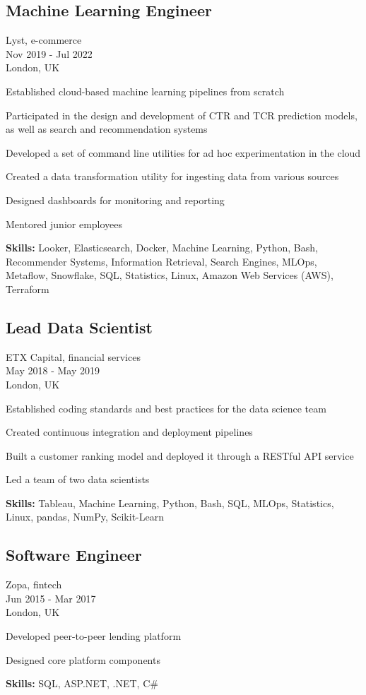 \documentclass[a4paper,10pt]{article}
\begin{document}
\subsection*{Machine Learning Engineer}
Lyst, e-commerce \\
Nov 2019 - Jul 2022 \\
London, UK
\begin{bulletlist}
    \item Established cloud-based machine learning pipelines from scratch
    \item Participated in the design and development of CTR and TCR prediction models, as well as search and recommendation systems
    \item Developed a set of command line utilities for ad hoc experimentation in the cloud
    \item Created a data transformation utility for ingesting data from various sources
    \item Designed dashboards for monitoring and reporting
    \item Mentored junior employees
\end{bulletlist}
\textbf{Skills:} Looker, Elasticsearch, Docker, Machine Learning, Python, Bash, Recommender Systems, Information Retrieval, Search Engines, MLOps, Metaflow, Snowflake, SQL, Statistics, Linux, Amazon Web Services (AWS), Terraform

\subsection*{Lead Data Scientist}
ETX Capital, financial services \\
May 2018 - May 2019 \\
London, UK
\begin{bulletlist}
    \item Established coding standards and best practices for the data science team
    \item Created continuous integration and deployment pipelines
    \item Built a customer ranking model and deployed it through a RESTful API service
    \item Led a team of two data scientists
\end{bulletlist}
\textbf{Skills: }Tableau, Machine Learning, Python, Bash, SQL, MLOps, Statistics, Linux, pandas, NumPy, Scikit-Learn

\subsection*{Software Engineer}
Zopa, fintech \\
Jun 2015 - Mar 2017 \\
London, UK
\begin{bulletlist}
    \item Developed peer-to-peer lending platform
    \item Designed core platform components
\end{bulletlist}
\textbf{Skills:} SQL, ASP.NET, .NET, C\#
\end{document}
